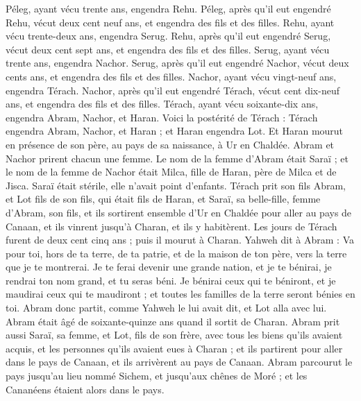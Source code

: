 \begin{multicols}{2}
Péleg, ayant vécu trente ans, engendra Rehu.
Péleg, après qu'il eut engendré Rehu, vécut deux cent neuf ans, et engendra des fils et des filles.
Rehu, ayant vécu trente-deux ans, engendra Serug.
Rehu, après qu'il eut engendré Serug, vécut deux cent sept ans, et engendra des fils et des filles.
Serug, ayant vécu trente ans, engendra Nachor.
Serug, après qu'il eut engendré Nachor, vécut deux cents ans, et engendra des fils et des filles.
Nachor, ayant vécu vingt-neuf ans, engendra Térach.
Nachor, après qu'il eut engendré Térach, vécut cent dix-neuf ans, et engendra des fils et des filles.
Térach, ayant vécu soixante-dix ans, engendra Abram, Nachor, et Haran.
Voici la postérité de Térach : Térach engendra Abram, Nachor, et Haran ; et Haran engendra Lot.
Et Haran mourut en présence de son père, au pays de sa naissance, à Ur en Chaldée.
Abram et Nachor prirent chacun une femme. Le nom de la femme d'Abram était Saraï ; et le nom de la femme de Nachor était Milca, fille de Haran, père de Milca et de Jisca.
Saraï était stérile, elle n'avait point d'enfants.
Térach prit son fils Abram, et Lot fils de son fils, qui était fils de Haran, et Saraï, sa belle-fille, femme d'Abram, son fils, et ils sortirent ensemble d'Ur en Chaldée pour aller au pays de Canaan, et ils vinrent jusqu'à Charan, et ils y habitèrent.
Les jours de Térach furent de deux cent cinq ans ; puis il mourut à Charan.
\VerseOne{}Yahweh dit à Abram : Va pour toi, hors de ta terre, de ta patrie, et de la maison de ton père, vers la terre que je te montrerai.
Je te ferai devenir une grande nation, et je te bénirai, je rendrai ton nom grand, et tu seras béni.
Je bénirai ceux qui te béniront, et je maudirai ceux qui te maudiront ; et toutes les familles de la terre seront bénies en toi.
Abram donc partit, comme Yahweh le lui avait dit, et Lot alla avec lui. Abram était âgé de soixante-quinze ans quand il sortit de Charan.
Abram prit aussi Saraï, sa femme, et Lot, fils de son frère, avec tous les biens qu'ils avaient acquis, et les personnes qu'ils avaient eues à Charan ; et ils partirent pour aller dans le pays de Canaan, et ils arrivèrent au pays de Canaan.
Abram parcourut le pays jusqu'au lieu nommé Sichem, et jusqu'aux chênes de Moré ; et les Cananéens étaient alors dans le pays.

\end{multicols}
